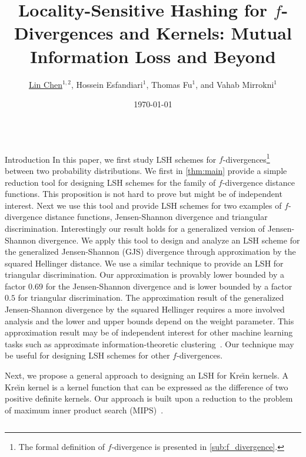 \documentclass{beamer}
\title{\huge Locality-Sensitive Hashing for $f$-Divergences and \kr Kernels: 
Mutual 
	Information Loss and Beyond}
\author{
	\underline{Lin Chen}$ ^{1,2} $,
	Hossein Esfandiari$ ^1 $,
	Thomas Fu$ ^1 $, and
	Vahab Mirrokni$ ^1 $
}
\institute{\large
	$ ^1 $Google Research, $ ^2 $Yale University
}
\date{\today}
\newcommand{\kr}{Kre\u{\i}n\xspace}
\begin{document}
\begin{frame}
\vspace{0.5cm}
\begin{columns}
	\begin{column}{.32\textwidth}
		\begin{block}{Introduction}
			In this paper, we first study LSH schemes for $ f 
			$-divergences\footnote{The 
				formal definition of $ f $-divergence is presented in 
				\cref{sub:f_divergence}.} 
			between 
			two probability distributions. 
			We first in \cref{thm:main} provide a simple reduction tool for 
			designing LSH 
			schemes for 
			the family of $f$-divergence distance functions. This proposition 
			is not hard 
			to prove but might be of independent interest. 
			Next we use this tool and provide LSH schemes for two examples of 
			$f$-divergence distance functions, Jensen-Shannon divergence and 
			triangular discrimination.
			Interestingly our result holds for a generalized version of 
			Jensen-Shannon divergence.
			We apply this tool to design and analyze an LSH scheme for the 
			generalized Jensen-Shannon (GJS)
			divergence through approximation by the squared Hellinger distance. 
			We use a similar technique to provide an LSH for triangular 
			discrimination. Our 
			approximation is provably lower bounded by a factor $0.69$ for the 
			Jensen-Shannon
			divergence and is lower bounded by a factor $0.5$ for triangular 
			discrimination. 
			The approximation result of the generalized Jensen-Shannon 
			divergence by the 
			squared Hellinger requires a more involved analysis and the lower 
			and upper 
			bounds depend on the weight parameter.
			This approximation result may be of independent interest for other 
			machine learning tasks such as approximate information-theoretic 
			clustering~\citep{chaudhuri2008finding}.
			Our technique may be useful for designing LSH schemes for other 
			$f$-divergences.
			
			Next, we 
			propose a general approach to designing an LSH for \kr kernels. A 
			\kr kernel is a kernel function that can be expressed as the 
			difference of two positive definite kernels. 
			Our approach is built upon a reduction to the problem of maximum 
			inner product search 
			(MIPS)~\citep{shrivastava2014asymmetric,neyshabur2015symmetric,yan2018norm}.
			 

\end{block}
\end{column}
\end{columns}
\end{frame}
\end{document}
